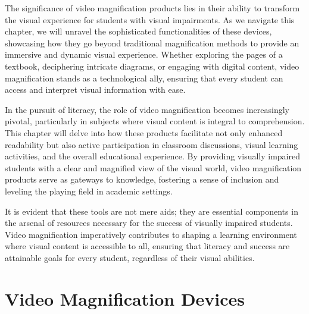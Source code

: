 \documentclass[14pt,letterpaper,twoside]{extreport}
\begin{document}
The significance of video magnification products lies in their ability to transform the visual experience for students with visual impairments. As we navigate this chapter, we will unravel the sophisticated functionalities of these devices, showcasing how they go beyond traditional magnification methods to provide an immersive and dynamic visual experience. Whether exploring the pages of a textbook, deciphering intricate diagrams, or engaging with digital content, video magnification stands as a technological ally, ensuring that every student can access and interpret visual information with ease.

In the pursuit of literacy, the role of video magnification becomes increasingly pivotal, particularly in subjects where visual content is integral to comprehension. This chapter will delve into how these products facilitate not only enhanced readability but also active participation in classroom discussions, visual learning activities, and the overall educational experience. By providing visually impaired students with a clear and magnified view of the visual world, video magnification products serve as gateways to knowledge, fostering a sense of inclusion and leveling the playing field in academic settings.

It is evident that these tools are not mere aids; they are essential components in the arsenal of resources necessary for the success of visually impaired students. Video magnification imperatively contributes to shaping a learning environment where visual content is accessible to all, ensuring that literacy and success are attainable goals for every student, regardless of their visual abilities.

\hypertarget{video-magnification-devices}{%
	\section{Video Magnification
	  Devices}\label{video-magnification-devices}}
\end{document}
